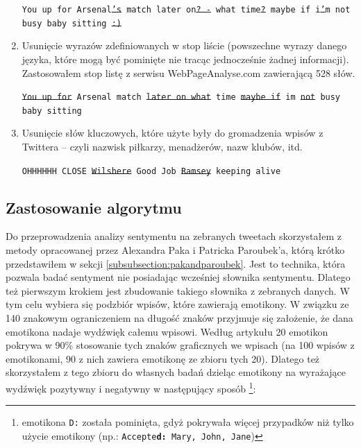 \begin{enumerate}
  \texttt{You up for Arsenal\sout{'s} match later on\sout{? -} what
  time\sout{?} maybe if i\sout{'}m not busy baby sitting \sout{:)}} 
	
	\item Usunięcie wyrazów zdefiniowanych w stop liście (powszechne wyrazy danego
	języka, które mogą być pominięte nie tracąc jednocześnie żadnej informacji).
	Zastosowałem stop listę z serwisu \mbox{WebPageAnalyse.com} 
	\cite{WebPageAnalyse} zawierającą 528 słów.

	\texttt{\sout{You up for} Arsenal match \sout{later on what} time \sout{maybe if} 
 	im \sout{not} busy baby sitting}
	
	\item Usunięcie słów kluczowych, które użyte były do gromadzenia wpisów z
	Twittera -- czyli nazwisk piłkarzy, menadżerów, nazw klubów, itd.
	
	
	\texttt{OHHHHHH CLOSE \sout{Wilshere} Good Job \sout{Ramsey} keeping alive}
	
\end{enumerate}





\subsection{Zastosowanie algorytmu}
\label{subsection:sentyment-algorytm}

Do przeprowadzenia analizy sentymentu na zebranych tweetach skorzystałem z
metody opracowanej przez Alexandra Paka i Patricka Paroubek'a, którą
krótko przedstawiłem w sekcji \ref{subsubsection:pakandparoubek}.
Jest to technika, która pozwala badać sentyment nie posiadając wcześniej 
słownika sentymentu. Dlatego też pierwszym krokiem jest zbudowanie takiego
słownika z zebranych danych.
W tym celu wybiera się podzbiór wpisów, które zawierają emotikony.
W związku ze 140 znakowym ograniczeniem na długość znaków przyjmuje się
założenie, że dana emotikona nadaje wydźwięk całemu wpisowi.
Według artykułu \cite{EmoticonAnalysisTwitter} 20 emotikon pokrywa
w 90\% stosowanie tych znaków graficznych we wpisach (na 100 wpisów z
emotikonami, 90 z nich zawiera emotikonę ze zbioru tych 20). Dlatego też
skorzystałem z tego zbioru do własnych badań dzieląc emotikony na wyrażające
wydźwięk pozytywny i negatywny w następujący sposób \footnote{emotikona
\texttt{D:} została pominięta, gdyż pokrywała więcej przypadków niż tylko
użycie emotikony (np.: \texttt{Accepte\textbf{d:} Mary, John, Jane})}:

